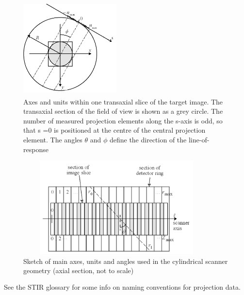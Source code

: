 \documentclass{article}
\begin{document}
\begin{figure}[htbp]
\begin{center}
\includegraphics[width=2in, height=2in]{graphics/STIR-developers-overviewFig1}
\caption{ Axes and units within one transaxial 
slice of the target image. The transaxial section of the field 
of view is shown as a grey circle. The number of measured projection 
elements along the s-axis is odd, so that s =0 is positioned 
at the centre of the central projection element. The angles \ensuremath{\theta} 
and \ensuremath{\phi} define the direction of the line-of-response }
\label{image-units}
\end{center}
\end{figure}

\begin{figure}[htbp]
\begin{center}
\includegraphics[width=4in, height=2in]{graphics/STIR-developers-overviewFig2}
\caption{Sketch of main axes, units and angles used in the cylindrical 
scanner geometry (axial section, not to scale)}
\label{scanner-image-units}
\end{center}
\end{figure}


See the STIR glossary for some info on naming conventions for 
projection data.
\end{document}
